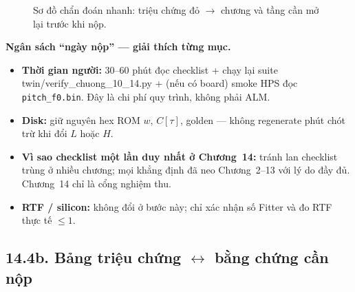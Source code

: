 \begin{figure}[H]
\centering
{}
\caption{Sơ đồ chẩn đoán nhanh: triệu chứng đỏ $\to$ chương và tầng cần mở lại trước khi nộp.}
\label{fig:ch14_debug_map}
\end{figure}

\begin{costbox}
\textbf{Ngân sách ``ngày nộp'' --- giải thích từng mục.}
\begin{itemize}[leftmargin=1.2em]
    \item \textbf{Thời gian người:} $30$--$60$ phút đọc checklist + chạy lại suite twin/verify\_chuong\_10\_14.py + (nếu có board) smoke HPS đọc \texttt{pitch\_f0.bin}. Đây là chi phí quy trình, không phải ALM.
    \item \textbf{Disk:} giữ nguyên hex ROM $w$, $C[\tau]$, golden --- không regenerate phút chót trừ khi đổi $L$ hoặc $H$.
    \item \textbf{Vì sao checklist một lần duy nhất ở Chương~14:} tránh lan checklist trùng ở nhiều chương; mọi khẳng định đã neo Chương~2--13 với lý do đầy đủ. Chương~14 chỉ là cổng nghiệm thu.
    \item \textbf{RTF / silicon:} không đổi ở bước này; chỉ xác nhận số Fitter và đo RTF thực tế $\le 1$.
\end{itemize}
\end{costbox}


\subsection*{14.4b. Bảng triệu chứng $\leftrightarrow$ bằng chứng cần nộp}


